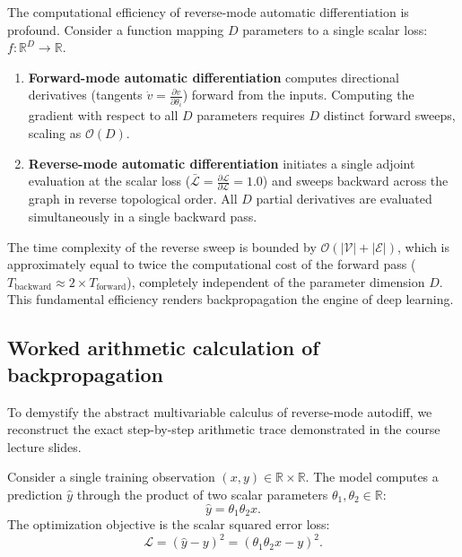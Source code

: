 \documentclass[../../main.tex]{subfiles}
\begin{document}
The computational efficiency of reverse-mode automatic differentiation is profound. Consider a function mapping $D$ parameters to a single scalar loss: $f: \mathbb{R}^D \to \mathbb{R}$.
\begin{enumerate}[label=(\roman*)]
    \item \textbf{Forward-mode automatic differentiation} computes directional derivatives (tangents $\dot{v} = \frac{\partial v}{\partial \theta_i}$) forward from the inputs. Computing the gradient with respect to all $D$ parameters requires $D$ distinct forward sweeps, scaling as $\mathcal{O}(D)$.
    \item \textbf{Reverse-mode automatic differentiation} initiates a single adjoint evaluation at the scalar loss ($\bar{\mathcal{L}} = \frac{\partial \mathcal{L}}{\partial \mathcal{L}} = 1.0$) and sweeps backward across the graph in reverse topological order. All $D$ partial derivatives are evaluated simultaneously in a single backward pass.
\end{enumerate}
The time complexity of the reverse sweep is bounded by $\mathcal{O}(|\mathcal{V}| + |\mathcal{E}|)$, which is approximately equal to twice the computational cost of the forward pass ($T_{\text{backward}} \approx 2 \times T_{\text{forward}}$), completely independent of the parameter dimension $D$. This fundamental efficiency renders backpropagation the engine of deep learning.

\subsection{Worked arithmetic calculation of backpropagation}
\label{subsec:worked_backprop_arithmetic}

To demystify the abstract multivariable calculus of reverse-mode autodiff, we reconstruct the exact step-by-step arithmetic trace demonstrated in the course lecture slides.

Consider a single training observation $(x, y) \in \mathbb{R} \times \mathbb{R}$. The model computes a prediction $\hat{y}$ through the product of two scalar parameters $\theta_1, \theta_2 \in \mathbb{R}$:
\begin{equation}
\hat{y} = \theta_1 \theta_2 x.
\end{equation}
The optimization objective is the scalar squared error loss:
\begin{equation}
\mathcal{L} = \left( \hat{y} - y \right)^2 = \left( \theta_1 \theta_2 x - y \right)^2.
\end{equation}
\end{document}
